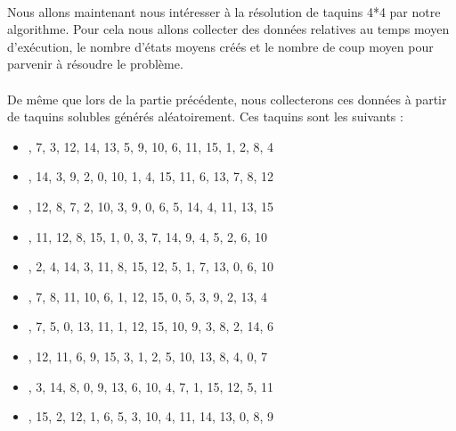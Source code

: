 \documentclass[10pt,a4paper]{report}
\begin{document}
\paragraph{}{Nous allons maintenant nous intéresser à la résolution de taquins 4*4 par notre algorithme. Pour cela nous allons collecter des données relatives au temps moyen d'exécution, le nombre d'états moyens créés et le nombre de coup moyen pour parvenir à résoudre le problème.}
\paragraph{}{De même que lors de la partie précédente, nous collecterons ces données à partir de taquins solubles générés aléatoirement. Ces taquins sont les suivants : }
\begin{itemize}
\item {}, 7, 3, 12, 14, 13, 5, 9, 10, 6, 11, 15, 1, 2, 8, 4\rbrack
\item {}, 14, 3, 9, 2, 0, 10, 1, 4, 15, 11, 6, 13, 7, 8, 12\rbrack
\item {}, 12, 8, 7, 2, 10, 3, 9, 0, 6, 5, 14, 4, 11, 13, 15\rbrack
\item {}, 11, 12, 8, 15, 1, 0, 3, 7, 14, 9, 4, 5, 2, 6, 10\rbrack
\item {}, 2, 4, 14, 3, 11, 8, 15, 12, 5, 1, 7, 13, 0, 6, 10\rbrack
\item {}, 7, 8, 11, 10, 6, 1, 12, 15, 0, 5, 3, 9, 2, 13, 4\rbrack
\item {}, 7, 5, 0, 13, 11, 1, 12, 15, 10, 9, 3, 8, 2, 14, 6\rbrack
\item {}, 12, 11, 6, 9, 15, 3, 1, 2, 5, 10, 13, 8, 4, 0, 7\rbrack
\item {}, 3, 14, 8, 0, 9, 13, 6, 10, 4, 7, 1, 15, 12, 5, 11\rbrack
\item {}, 15, 2, 12, 1, 6, 5, 3, 10, 4, 11, 14, 13, 0, 8, 9\rbrack
\end{itemize}
\end{document}
